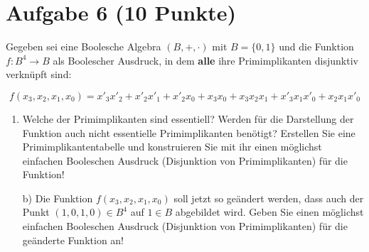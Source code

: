 \section*{Aufgabe 6 (10 Punkte)}

Gegeben sei eine Boolesche Algebra $(B, +, \cdot)$ mit $B = \{0, 1\}$ und die Funktion $f : B^4 \rightarrow B$ als Boolescher Ausdruck, in dem \textbf{alle} ihre Primimplikanten disjunktiv verknüpft sind:

$$
f(x_3, x_2, x_1, x_0) = x'_3 x'_2 + x'_2 x'_1 + x'_2 x_0 + x_3x_0 + x_3 x_2 x_1 + x'_3 x_1 x'_0 + x_2 x_1 x'_0
$$

\begin{enumerate}[label={a)}, leftmargin=*]
\item Welche der Primimplikanten sind essentiell? Werden für die Darstellung der Funktion auch nicht essentielle Primimplikanten benötigt? Erstellen Sie eine Primimplikantentabelle und konstruieren Sie mit ihr einen möglichst einfachen Booleschen Ausdruck (Disjunktion von Primimplikanten) für die Funktion!
\item[b)] Die Funktion $f(x_3,x_2,x_1,x_0)$ soll jetzt so geändert werden, dass auch der Punkt $(1, 0, 1, 0) \in B^4$ auf $1 \in B$ abgebildet wird. Geben Sie einen möglichst einfachen Booleschen Ausdruck (Disjunktion von Primimplikanten) für die geänderte Funktion an!
\end{enumerate}